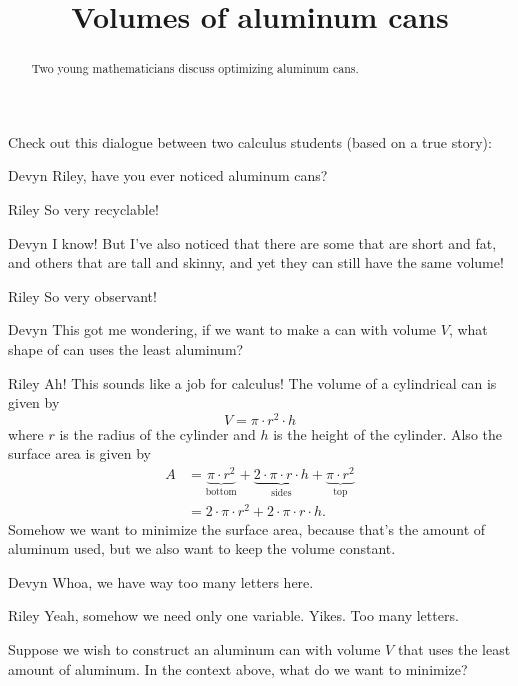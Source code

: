 \documentclass{ximera}
\title[Break-Ground:]{Volumes of aluminum cans}
\begin{document}
\begin{abstract}
Two young mathematicians discuss optimizing aluminum cans.
\end{abstract}
\maketitle

Check out this dialogue between two calculus students (based on a true
story):

\begin{dialogue}
\item[Devyn] Riley, have you ever noticed aluminum cans?
\item[Riley] So very recyclable! 
\item[Devyn] I know! But I've also noticed that there are some that
  are short and fat, and others that are tall and skinny, and yet they
  can still have the same volume!
\item[Riley] So very observant! 
\item[Devyn] This got me wondering, if we want to make a can with
  volume $V$, what shape of can uses the least aluminum?
\item[Riley] Ah! This sounds like a job for calculus!  The volume of a cylindrical can is given by
  \[
  V = \pi \cdot r^2 \cdot h
  \]
  where $r$ is the radius of the cylinder and $h$ is the height of the
  cylinder. Also the surface area is given by
  \begin{align*}
    A &= \underbrace{\pi \cdot r^2}_{\text{bottom}} + \underbrace{2\cdot\pi \cdot r\cdot h}_{\text{sides}} + \underbrace{\pi \cdot r^2}_{\text{top}}\\
    &= 2\cdot \pi \cdot r^2 + 2\cdot\pi \cdot r\cdot h.    
  \end{align*}
  Somehow we want to minimize the surface area, because that's the
  amount of aluminum used, but we also want to keep the volume constant.
\item[Devyn] Whoa, we have way too many letters here.
\item[Riley] Yeah, somehow we need only one variable. Yikes. Too many letters.
\end{dialogue}

\begin{problem}
  Suppose we wish to construct an aluminum can with volume $V$ that
  uses the least amount of aluminum. In the context above, what do we
  want to minimize?
  \begin{multipleChoice}
  \end{multipleChoice}
\end{problem}
\end{document}
